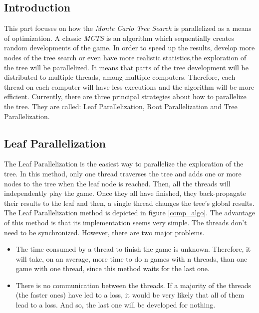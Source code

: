 \label{third part}
\subsection{Introduction}

This part focuses on how the \emph{Monte Carlo Tree Search} is parallelized as a means of optimization. A classic \emph{MCTS} is an algorithm which sequentially creates random developments of the game. In order to speed up the results, develop more nodes of the tree search or even have more realistic statistics,the exploration of the tree will be parallelized. It means that parts of the tree development will be distributed to multiple threads, among multiple computers. Therefore, each thread on each computer will have less executions and the algorithm will be more efficient.
\newline
\newline
Currently, there are three principal strategies about how to parallelize the tree. They are called: Leaf Parallelization, Root Parallelization and Tree Parallelization\cite{parallel_comp, master_mcts_kozeleck}.

\subsection{Leaf Parallelization}

The Leaf Parallelization is the easiest way to parallelize the exploration of the tree. In this method, only one thread traverses the tree and adds one or more nodes to the tree when the leaf node is reached. Then, all the threads will independently play the game. Once they all have finished, they back-propagate their results to the leaf and then, a single thread changes the tree’s global results. The Leaf Parallelization method is depicted in figure \ref{comp_algo}.
\newline
\newline
The advantage of this method is that its implementation seems very simple. The threads don't need to be synchronized. However, there are two major problems.
\begin{itemize}
     \item The time consumed by a thread to finish the game is unknown. Therefore, it will take, on an average, more time to do n games with n threads, than one game with one thread, since this method waits for the last one.
     \item There is no communication between the threads. If a majority of the threads (the faster ones) have led to a loss, it would be very likely that all of them lead to a loss. And so, the last one will be developed for nothing. 
  \end{itemize}

